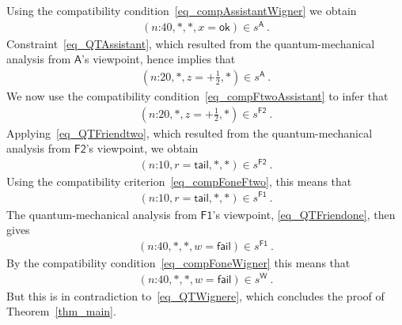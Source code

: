 \documentclass{article}
\theoremstyle{plain}
\theoremstyle{definition}
\newcommand*{\Friendone}{\mathsf{F1}}
\newcommand*{\Friendtwo}{\mathsf{F2}}
\newcommand*{\Assistant}{\mathsf{A}}
\newcommand*{\Wigner}{\mathsf{W}}
\newcommand*{\sminus}{{\textstyle - \frac{1}{2}}}
\newcommand*{\splus}{{\textstyle + \frac{1}{2}}}
\newcommand*{\ok}{\mathsf{ok}}
\newcommand*{\fail}{\mathsf{fail}}
\newcommand*{\tail}{\mathsf{tail}}
\begin{document}
Using the compatibility condition~\eqref{eq_compAssistantWigner} we obtain
\begin{align*}
  (\text{$n$:40}, *, *,  x = \ok) \in s^{\Assistant}   \ .
\end{align*} 
 Constraint~\eqref{eq_QTAssistant}, which resulted from the quantum-mechanical analysis from $\Assistant$'s viewpoint, hence implies that  
\begin{align*}
    (\text{$n$:20}, *, z=\splus,  *) \in s^{\Assistant}   \ .
\end{align*}
We now use the compatibility condition~\eqref{eq_compFtwoAssistant}  to infer that
\begin{align*}
      (\text{$n$:20}, *, z=\splus,  *) \in s^{\Friendtwo}  \ .
\end{align*}
Applying~\eqref{eq_QTFriendtwo}, which resulted from the quantum-mechanical analysis from $\Friendtwo$'s viewpoint, we obtain 
\begin{align*} 
 (\text{$n$:10}, r = \tail, *, *) \in s^{\Friendtwo} \ .
\end{align*}
Using the compatibility criterion~\eqref{eq_compFoneFtwo}, this means that 
\begin{align} \label{eq_rtail}
 (\text{$n$:10}, r=\tail, *, *) \in s^{\Friendone}  \ .
\end{align}
The quantum-mechanical analysis from $\Friendone$'s viewpoint, \eqref{eq_QTFriendone}, then gives
\begin{align*}
 (\text{$n$:40},  *, *, w=\fail) \in s^{\Friendone}  \ .
\end{align*} 
By the compatibility condition~\eqref{eq_compFoneWigner} this means that
\begin{align*}
  (\text{$n$:40}, *, *, w=\fail ) \in s^{\Wigner} \ .
\end{align*}
But this is in contradiction to~\eqref{eq_QTWignere}, which concludes the proof of Theorem~\ref{thm_main}. 
\end{document}
